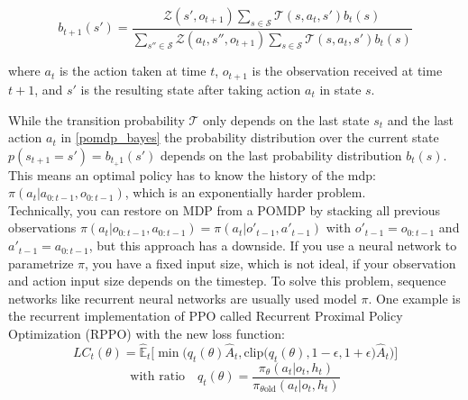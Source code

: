\begin{equation}
    \label{pomdp_bayes}
b_{t+1}(s') = \frac{\mathcal{Z}(s', o_{t+1}) \sum_{s \in \mathcal{S}} \mathcal{T}(s, a_t, s') b_t(s)}{\sum_{s'' \in \mathcal{S}} \mathcal{Z}(a_t, s'', o_{t+1}) \sum_{s \in \mathcal{S}} \mathcal{T}(s, a_t, s') b_t(s)}
\end{equation}

where $a_t$ is the action taken at time $t$, $o_{t+1}$ is the observation received at time $t+1$, and $s'$ is the resulting state after taking action $a_t$ in state $s$.

While the transition probability $\mathcal{T}$ only depends on the last state $s_t$ and the last action $a_t$ 
in \ref{pomdp_bayes} the probability distribution over the current state $p(s_{t+1} = s') = b_{t_+1}(s')$ depends on the last probability distribution $b_{t}(s)$.
This means an optimal policy has to know the history of the mdp: $\pi(a_t|a_{0:t-1}, o_{0:t-1})$, which is an exponentially harder problem. \\
Technically, you can restore on MDP from a POMDP by stacking all previous observations $\pi(a_t|o_{0:t-1}, a_{0:t-1}) = \pi(a_t|o'_{t-1}, a'_{t-1})$ 
with $o'_{t-1} = o_{0:t-1}$ and $a'_{t-1} = a_{0:t-1}$, but this approach has a downside. If you use a neural network to parametrize $\pi$, you have 
a fixed input size, which is not ideal, if your observation and action input size depends on the timestep. To solve this problem, sequence networks like 
recurrent neural networks are usually used model $\pi$. One example is the recurrent implementation of PPO called Recurrent Proximal Policy Optimization (RPPO) 
\cite{RPPO} with the new loss function:
\begin{equation}
    LC_t(\theta) = \widehat{\mathbb{E}}_t\big[\min\big(q_t(\theta)\widehat{A}_t, \text{clip}\big(q_t(\theta), 1 - \epsilon, 1 + \epsilon\big)\widehat{A}_t\big)\big] \tag{1}
\end{equation}
\begin{equation*}
    \text{with ratio} \quad q_t(\theta) = \frac{\pi_{\theta}(a_t \vert o_t, h_t)}{\pi_{\theta \text{old}}(a_t \vert o_t, h_t)}
\end{equation*}

